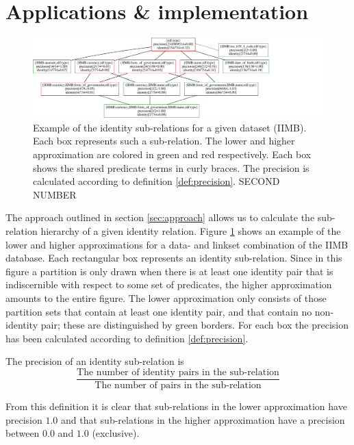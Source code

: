 \section{Applications \& implementation}

\begin{figure}
\label{fig:ihierarchy}
\centering
\includegraphics[width=\textwidth]{./img/iimb_16_2}
\caption{
  Example of the identity sub-relations for a given dataset (IIMB).
  Each box represents such a sub-relation.
  The lower and higher approximation are colored in green and red
    respectively.
  Each box shows the shared predicate terms in curly braces.
  The precision is calculated according to definition \ref{def:precision}.
  SECOND NUMBER
}
\end{figure}

The approach outlined in section \ref{sec:approach}
  allows us to calculate the sub-relation hierarchy of
  a given identity relation.
Figure \ref{fig:ihierarchy} shows an example of the lower and higher
  approximations for a data- and linkset combination of the IIMB database.
Each rectangular box represents an identity sub-relation.
Since in this figure a partition is only drawn when there is at least one
  identity pair that is indiscernible with respect to some set of
  predicates, the higher approximation amounts to the entire figure.
The lower approximation only consists of those partition sets that contain
  at least one identity pair, and that contain no non-identity pair;
  these are distinguished by green borders.
For each box the precision has been calculated
  according to definition \ref{def:precision}.

\begin{definition}[Precision]
\label{def:precision}
The precision of an identity sub-relation is
\[
  \frac{
    \text{The number of identity pairs in the sub-relation}
  }{
    \text{The number of pairs in the sub-relation}
  }
\]
\end{definition}

From this definition it is clear that
    sub-relations in the lower approximation have precision $1.0$
  and that
    sub-relations in the higher approximation have a precision
      between $0.0$ and $1.0$ (exclusive).



